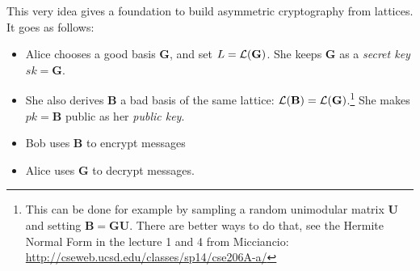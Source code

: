 \documentclass[12pt]{article}
\renewcommand{\vec}{\mathbf}
\begin{document}
This very idea gives a foundation to build asymmetric cryptography from lattices. It goes as follows:
\begin{itemize}
  \item Alice chooses a good basis $\vec G$, and set $L = \cL(\vec G)$. She keeps $\vec G$ as a {\em secret key} $sk = \vec G$.
  \item She also derives $\vec B$ a bad basis of the same lattice: $\cL(\vec B) = \cL(\vec G)$.\footnote{ This can be done for example by sampling a random unimodular matrix $\vec U$ and setting $\vec B = \vec G \vec U$. There are better ways to do that, see the Hermite Normal Form in the lecture 1 and 4 from Micciancio: \url{http://cseweb.ucsd.edu/classes/sp14/cse206A-a/} } She makes $pk = \vec B$ public as her {\em public key}.
  \item Bob uses $\vec B$ to encrypt messages
  \item Alice uses $\vec G$ to decrypt messages.
\end{itemize}
\end{document}
